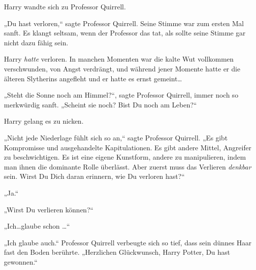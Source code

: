 Harry wandte sich zu Professor Quirrell.

„Du hast verloren,“ sagte Professor Quirrell. Seine Stimme war zum ersten Mal sanft. Es klangt seltsam, wenn der Professor das tat, als sollte seine Stimme gar nicht dazu fähig sein.

Harry \emph{hatte} verloren. In manchen Momenten war die kalte Wut vollkommen verschwunden, von Angst verdrängt, und während jener Momente hatte er die älteren Slytherins angefleht und er hatte es ernst gemeint…

„Steht die Sonne noch am Himmel?“, sagte Professor Quirrell, immer noch so merkwürdig sanft. „Scheint sie noch? Bist Du noch am Leben?“

Harry gelang es zu nicken.

„Nicht jede Niederlage fühlt sich so an,“ sagte Professor Quirrell. „Es gibt Kompromisse und ausgehandelte Kapitulationen. Es gibt andere Mittel, Angreifer zu beschwichtigen. Es ist eine eigene Kunstform, andere zu manipulieren, indem man ihnen die dominante Rolle überlässt. Aber zuerst muss das Verlieren \emph{denkbar} sein. Wirst Du Dich daran erinnern, wie Du verloren hast?“

„Ja.“

„Wirst Du verlieren können?“

„Ich…glaube schon …“

„Ich glaube auch.“ Professor Quirrell verbeugte sich so tief, dass sein dünnes Haar fast den Boden berührte. „Herzlichen Glückwunsch, Harry Potter, Du hast gewonnen.“

